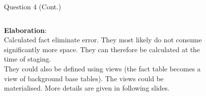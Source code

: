 \begin{frame}[fragile]{Question 4 (Cont.)}
\begin{columns}[t,onlytextwidth]
	\textbf{Elaboration}:\\\vspace{10pt}
	Calculated fact eliminate error. They most likely do not consume significantly more space. They can therefore be calculated at the time of staging.\\\vspace{5pt}
	They could also be defined using views (the fact table becomes a view of background base tables). The views could be materialised.
	More details are given in following slides.
	\begin{figure}
		\vspace{-15pt}
	\end{figure}
\end{columns}
\end{frame}

